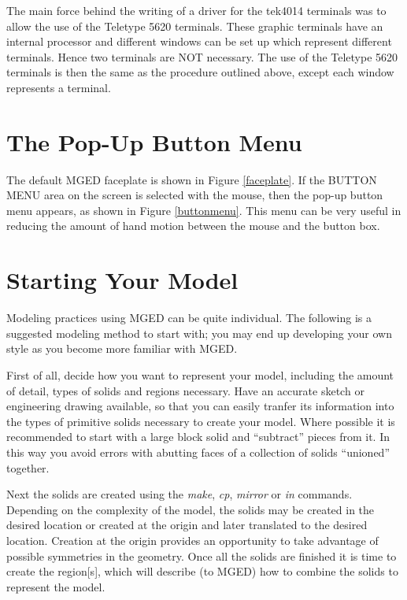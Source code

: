 The main force behind the writing of a driver for the tek4014 terminals
was to allow the use of the Teletype 5620 terminals.
These graphic terminals have an internal processor and different windows
can be set up which represent different terminals.
Hence two terminals are NOT necessary.
The use of the Teletype 5620 terminals is then the same as the procedure
outlined above, except each window represents a terminal.

\section{The Pop-Up Button Menu}

The default MGED faceplate is shown in Figure \ref{faceplate}.
If the BUTTON MENU area on the screen is selected with the mouse,
then the pop-up button menu appears, as shown in Figure \ref{buttonmenu}.
This menu can be very useful in reducing the amount of hand motion
between the mouse and the button box.

\section{Starting Your Model}

Modeling practices using MGED can be quite individual.  The following is a
suggested modeling method to start with; you may end up developing your own
style as you become more familiar with MGED.  

First of all, decide how you want to represent your model, including the
amount of detail, types of solids and regions necessary.  Have an accurate
sketch or engineering drawing available, so that you can easily tranfer its
information into the types of primitive solids necessary to create your model.
Where possible it is recommended to start with a large block solid and
``subtract'' pieces from it.  In this way you avoid errors with abutting
faces of a collection of solids ``unioned'' together.

Next the solids are created using the
{\em make}, {\em cp}, {\em mirror} or {\em in} 
commands.  Depending on the complexity of the model, the solids may be
created in the desired location or created at the origin and later
translated to the desired location.  Creation at the origin provides
an opportunity to take advantage of possible symmetries in the geometry.
Once all the solids are finished it is time to create the region[s],
which will describe (to MGED) how to combine the solids to represent
the model.

